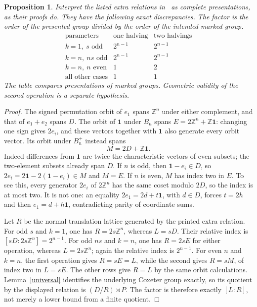 \documentclass[11pt,a4paper]{article}
\newtheorem{proposition}[theorem]{Proposition}
\newcommand{\Z}{\mathbb Z}
\newcommand{\one}{\mathbf1}
\begin{document}
\begin{proposition}\label{comparison}
Interpret the listed extra relations in~\cite{PT} as complete
presentations, as their proofs do. They have the following exact
discrepancies. The factor is the order of the presented group
divided by the order of the intended marked group.
\[
\begin{array}{c|c|c}
\text{parameters}&\text{one halving}&\text{two halvings}\\\hline
k=1,\ s\text{ odd}&2^{n-1}&2^{n-1}\\
k=n,\ ns\text{ odd}&2^{n-1}&2^{n-1}\\
k=n,\ n\text{ even}&1&2\\
\text{all other cases}&1&1
\end{array}
\]
The table compares presentations of marked groups. Geometric
validity of the second operation is a separate hypothesis.
\end{proposition}
\begin{proof}
The signed permutation orbit of $e_1$ spans $\Z^n$ under
either complement, and that of $e_1+e_2$ spans $D$.
The orbit of $\one$ under $B_n$ spans
$E=2\Z^n+\Z\one$: changing one sign gives $2e_i$, and these
vectors together with $\one$ also generate every orbit vector.
Its orbit under $B_n^+$ instead spans
\[
 M=2D+\Z\one.
\]
Indeed differences from $\one$ are twice the characteristic
vectors of even subsets; the two-element subsets already span $D$.
If $n$ is odd, then $\one-e_i\in D$, so
$2e_i=2\one-2(\one-e_i)\in M$ and $M=E$.
If $n$ is even, $M$ has index two in $E$. To see this, every
generator $2e_i$ of $2\Z^n$ has the same coset modulo $2D$,
so the index is at most two. It is not one: an equality
$2e_1=2d+t\one$, with $d\in D$, forces $t=2h$ and then
$e_1=d+h\one$, contradicting parity of coordinate sums.

Let $R$ be the normal translation lattice generated by the
printed extra relation. For odd $s$ and $k=1$, one has
$R=2s\Z^n$, whereas $L=sD$. Their relative index is
$[sD:2s\Z^n]=2^{n-1}$. For odd $ns$ and $k=n$, one has
$R=2sE$ for either operation, whereas $L=2s\Z^n$;
again the relative index is $2^{n-1}$. For even $n$ and $k=n$,
the first operation gives $R=sE=L$, while the second gives
$R=sM$, of index two in $L=sE$.
The other rows give $R=L$ by the same orbit calculations.
Lemma~\ref{universal} identifies the underlying Coxeter group
exactly, so its quotient by the displayed relation is
$(D/R)\rtimes P$. The factor is therefore exactly $[L:R]$,
not merely a lower bound from a finite quotient.
\end{proof}
\end{document}
